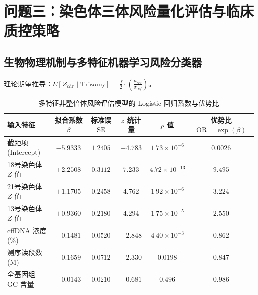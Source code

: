 ﻿\documentclass[12pt,a4paper]{article}
\begin{document}
\begin{table}[H]
\centering
\caption{不同 BMI 分层人群的最优检测孕周与推迟建议}
\end{table}


\section{问题三：染色体三体风险量化评估与临床质控策略}


\subsection{生物物理机制与多特征机器学习风险分类器}
理论期望推导：$E[Z_{chr} \mid \text{Trisomy}] = \frac{f}{2} \cdot \left(\frac{\mu_{ref}}{\sigma_{ref}}\right)$。


\begin{table}[H]
\centering
\caption{多特征非整倍体风险评估模型的 Logistic 回归系数与优势比}
\begin{tabular}{lccccc}
\toprule
输入特征 & 拟合系数 $\beta$ & 标准误 $\text{SE}$ & $z$ 统计量 & $p$ 值 & 优势比 $\text{OR} = \exp(\beta)$ \\
\midrule
截距项 (Intercept) & $-5.9333$ & $1.2405$ & $-4.783$ & $1.73 \times 10^{-6}$ & $0.0026$ \\
18号染色体 $Z$ 值 & $+2.2508$ & $0.3112$ & $7.233$ & $4.72 \times 10^{-13}$ & $9.495$ \\
21号染色体 $Z$ 值 & $+1.1705$ & $0.2458$ & $4.762$ & $1.92 \times 10^{-6}$ & $3.224$ \\
13号染色体 $Z$ 值 & $+0.9360$ & $0.2180$ & $4.294$ & $1.75 \times 10^{-5}$ & $2.550$ \\
cffDNA 浓度 ($\%$) & $-0.1481$ & $0.0520$ & $-2.848$ & $4.40 \times 10^{-3}$ & $0.862$ \\
测序读段数 (M) & $-0.1659$ & $0.0712$ & $-2.330$ & $0.0198$ & $0.847$ \\
全基因组 GC 含量 & $-0.0143$ & $0.0210$ & $-0.681$ & $0.496$ & $0.986$ \\
\bottomrule
\end{tabular}
\end{table}
\end{document}

